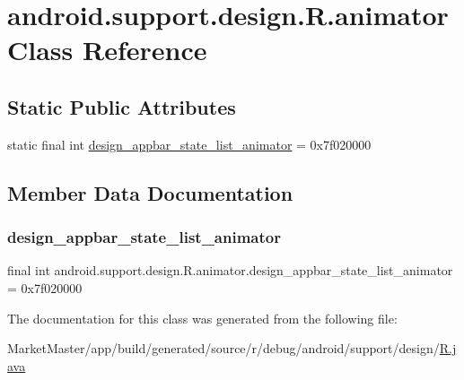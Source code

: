 \hypertarget{classandroid_1_1support_1_1design_1_1R_1_1animator}{}\section{android.\+support.\+design.\+R.\+animator Class Reference}
\label{classandroid_1_1support_1_1design_1_1R_1_1animator}
\subsection*{Static Public Attributes}
\begin{DoxyCompactItemize}
\item 
static final int \mbox{\hyperlink{classandroid_1_1support_1_1design_1_1R_1_1animator_a2a7ecd7d450a8c927648ee2ed48886bf}{design\+\_\+appbar\+\_\+state\+\_\+list\+\_\+animator}} = 0x7f020000
\end{DoxyCompactItemize}


\subsection{Member Data Documentation}
\mbox{\label{classandroid_1_1support_1_1design_1_1R_1_1animator_a2a7ecd7d450a8c927648ee2ed48886bf}} 
\subsubsection{\texorpdfstring{design\+\_\+appbar\+\_\+state\+\_\+list\+\_\+animator}{design\_appbar\_state\_list\_animator}}
{\footnotesize\ttfamily final int android.\+support.\+design.\+R.\+animator.\+design\+\_\+appbar\+\_\+state\+\_\+list\+\_\+animator = 0x7f020000\hspace{0.3cm}{\ttfamily [static]}}



The documentation for this class was generated from the following file\+:\begin{DoxyCompactItemize}
\item 
Market\+Master/app/build/generated/source/r/debug/android/support/design/\mbox{\hyperlink{debug_2android_2support_2design_2R_8java}{R.\+java}}\end{DoxyCompactItemize}
